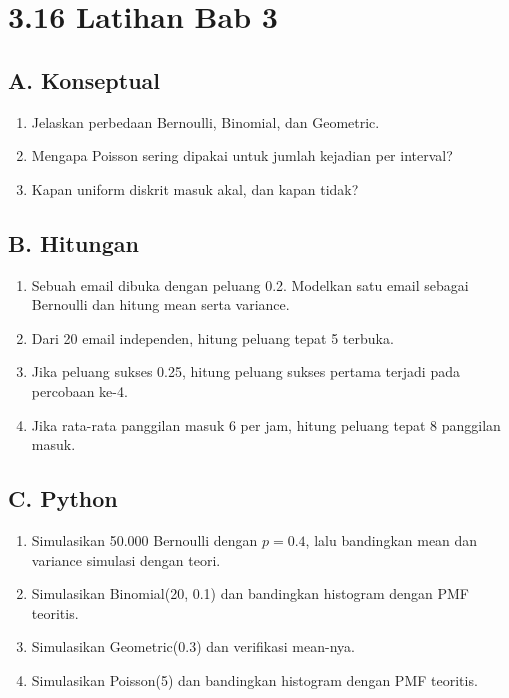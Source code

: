 \documentclass[
  letterpaper,
  DIV=11,
  numbers=noendperiod]{scrreprt}
\providecommand{\tightlist}{%
  \setlength{\itemsep}{0pt}\setlength{\parskip}{0pt}}
\begin{document}
\section{3.16 Latihan Bab 3}\label{latihan-bab-3}

\subsection{A. Konseptual}\label{a.-konseptual-2}

\begin{enumerate}
\def\labelenumi{\arabic{enumi}.}
\tightlist
\item
  Jelaskan perbedaan Bernoulli, Binomial, dan Geometric.
\item
  Mengapa Poisson sering dipakai untuk jumlah kejadian per interval?
\item
  Kapan uniform diskrit masuk akal, dan kapan tidak?
\end{enumerate}

\subsection{B. Hitungan}\label{b.-hitungan-1}

\begin{enumerate}
\def\labelenumi{\arabic{enumi}.}
\tightlist
\item
  Sebuah email dibuka dengan peluang 0.2. Modelkan satu email sebagai
  Bernoulli dan hitung mean serta variance.
\item
  Dari 20 email independen, hitung peluang tepat 5 terbuka.
\item
  Jika peluang sukses 0.25, hitung peluang sukses pertama terjadi pada
  percobaan ke-4.
\item
  Jika rata-rata panggilan masuk 6 per jam, hitung peluang tepat 8
  panggilan masuk.
\end{enumerate}

\subsection{C. Python}\label{c.-python-1}

\begin{enumerate}
\def\labelenumi{\arabic{enumi}.}
\tightlist
\item
  Simulasikan 50.000 Bernoulli dengan \(p=0.4\), lalu bandingkan mean
  dan variance simulasi dengan teori.
\item
  Simulasikan Binomial(20, 0.1) dan bandingkan histogram dengan PMF
  teoritis.
\item
  Simulasikan Geometric(0.3) dan verifikasi mean-nya.
\item
  Simulasikan Poisson(5) dan bandingkan histogram dengan PMF teoritis.
\end{enumerate}
\end{document}
